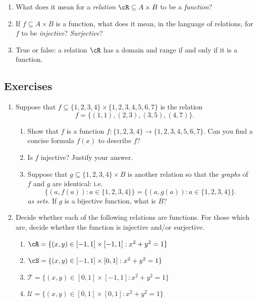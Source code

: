 	\begin{enumerate}
    \item What does it mean for a \emph{relation} $\cR\subseteq A\times B$ to be a \emph{function}?
    \item If $f\subseteq A\times B$ is a function, what does it mean, in the language of relations, for $f$ to be \emph{injective}? \emph{Surjective}?
    \item True or false: a relation $\cR$ has a domain and range if and only if it is a function.
  \end{enumerate}


\subsection*{Exercises}

\begin{enumerate}\renewcommand{\labelenumi}{\thesubsection.\theenumi}
  \item Suppose that $f\subseteq\{1,2,3,4\}\times\{1,2,3,4,5,6,7\}$ is the relation
  \[f=\{(1,1),(2,3),(3,5),(4,7)\}.\]
  \begin{enumerate}
    \item Show that $f$ is a function $f:\{1,2,3,4\}\to\{1,2,3,4,5,6,7\}$. Can you find a concise formula $f(x)$ to describe $f$?
    \item Is $f$ injective? Justify your answer.
    \item Suppose that $g\subseteq\{1,2,3,4\}\times B$ is another relation so that the \emph{graphs} of $f$ and $g$ are identical: i.e.
    \[\bigl\{(a,f(a)):a\in\{1,2,3,4\}\bigr\}=\bigl\{(a,g(a)):a\in\{1,2,3,4\}\bigr\}.\] \emph{as sets.} If $g$ is a bijective function, what is $B$?
  \end{enumerate}
  
  \item Decide whether each of the following relations are functions. For those which are, decide whether the function is injective and/or surjective.
  \begin{enumerate}
    \item $\cR=\{(x,y)\in[-1,1]\times[-1,1]:x^2+y^2=1\}$
    \item $\cS=\{(x,y)\in[-1,1]\times[0,1]:x^2+y^2=1\}$
    \item $\mathcal T=\{(x,y)\in[0,1]\times[-1,1]:x^2+y^2=1\}$
    \item $\mathcal U=\{(x,y)\in[0,1]\times[0,1]:x^2+y^2=1\}$
  \end{enumerate}
  

\end{enumerate}
